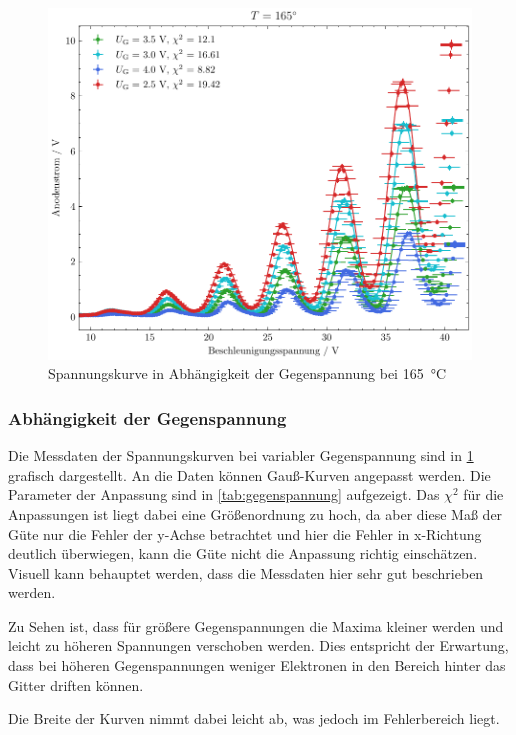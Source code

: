 \begin{figure}[htb]
    \centering
    \includegraphics[width=0.6\linewidth]{../figs/franck-hertz_gegenspannung}
    \caption{Spannungskurve in Abhängigkeit der Gegenspannung bei \SI{165}{\celsius}}
    \label{fig:gegenspannung}
\end{figure}

\subsubsection{Abhängigkeit der Gegenspannung}\label{sec:franck-hertz-gegen}
Die Messdaten der Spannungskurven bei variabler Gegenspannung sind in 
\cref{fig:gegenspannung} grafisch dargestellt. An die Daten können Gauß-Kurven
angepasst werden. Die Parameter der Anpassung sind in \cref{tab:gegenspannung}
aufgezeigt. Das $\chi^2$ für die Anpassungen ist liegt dabei eine Größenordnung zu
hoch, da aber diese Maß der Güte nur die Fehler der y-Achse betrachtet und 
hier die Fehler in x-Richtung deutlich überwiegen, kann die Güte 
nicht die Anpassung richtig einschätzen. Visuell kann behauptet werden,
dass die Messdaten hier sehr gut beschrieben werden.

Zu Sehen ist, dass für größere Gegenspannungen 
die Maxima kleiner werden und leicht zu höheren Spannungen verschoben werden. 
Dies entspricht der Erwartung, dass bei höheren Gegenspannungen weniger 
Elektronen in den Bereich hinter das Gitter driften können.

Die Breite der Kurven nimmt dabei leicht ab, was jedoch im Fehlerbereich liegt.

